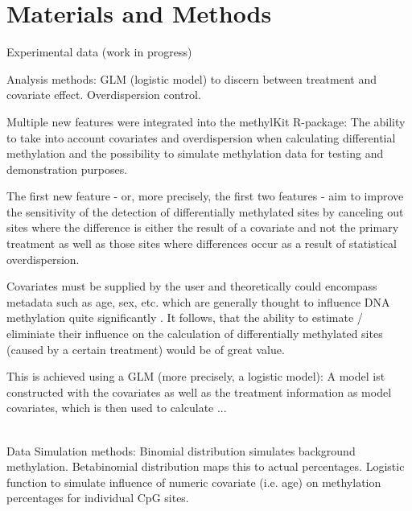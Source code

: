 \section{Materials and Methods}

Experimental data (work in progress)

Analysis methods: GLM (logistic model) to discern between treatment and covariate effect. 
Overdispersion control.

Multiple new features were integrated into the methylKit R-package: The ability to take into account covariates and overdispersion when calculating differential methylation and the possibility to simulate methylation data for testing and demonstration purposes.

The first new feature - or, more precisely, the first two features - aim to  improve the sensitivity of the detection of differentially methylated sites by canceling out sites where the difference is either the result of a covariate and not the primary treatment as well as those sites where differences occur as a result of statistical overdispersion.

Covariates must be supplied by the user and theoretically could encompass metadata such as age, sex, etc. which are generally thought to influence DNA methylation quite significantly \cite{24561809}. It follows, that the ability to estimate / eliminiate their influence on the calculation of differentially methylated sites (caused by a certain treatment) would be of great value.

This is achieved using a GLM (more precisely, a logistic model): A model ist constructed with the covariates as well as the treatment information as model covariates, which is then used to calculate ...

\\
Data Simulation methods: Binomial distribution simulates background methylation. 
Betabinomial distribution maps this to actual percentages.
Logistic function to simulate influence of numeric covariate (i.e. age) on methylation percentages for individual CpG sites.
  
  
  
  